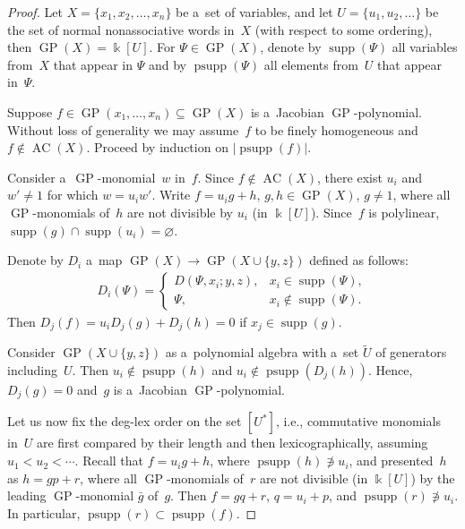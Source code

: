 \documentclass[pdftex]{sigma}
\DeclareMathOperator{\psupp}{psupp}
\DeclareMathOperator{\supp}{supp}
\begin{document}
\begin{proof}
Let $X=\{x_1,x_2,\dots, x_n \}$ be a~set of variables, and let $U=\{u_1,u_2,\dots \}$ be the set of normal
nonassociative words in~$X$ (with respect to some ordering), then $\operatorname{GP}(X) = \Bbbk[U]$.
For $\Psi \in \operatorname{GP}(X)$, denote by $\supp(\Psi)$ all variables from~$X$ that appear in $\Psi $ and by
$\psupp(\Psi)$ all elements from~$U$ that appear in~$\Psi $.

Suppose $f\in \operatorname{GP}(x_1,\dots, x_n)\subseteq \operatorname{GP}(X)$ is a~Jacobian $\operatorname{GP}$-polynomial.
Without loss of generality we may assume~$f$ to be f\/inely homogeneous and $f\notin \operatorname{AC}(X)$.
Proceed by induction on $|\psupp(f)|$.

Consider a~$\operatorname{GP}$-monomial~$w$ in~$f$.
Since $f\not\in \operatorname{AC}(X)$, there exist $u_i$ and $w'\neq 1$ for which $w = u_iw'$.
Write $f = u_ig + h$, $g,h\in \operatorname{GP}(X)$, $g\ne 1$, where all $\operatorname{GP}$-monomials of~$h$ are not divisible by $u_i$ (in $\Bbbk[U]$).
Since~$f$ is polylinear, $\supp(g) \cap \supp(u_i) = \varnothing$.

Denote by $D_i$ a~map $ \operatorname{GP}(X) \to \operatorname{GP}(X\cup \{y,z\})$ def\/ined as follows:
\begin{gather*}
D_i(\Psi) =
\begin{cases}
D(\Psi, x_i; y,z), & x_i\in \supp (\Psi),
\\
\Psi, & x_i\notin \supp (\Psi).
\end{cases}
\end{gather*}
Then $D_j(f) = u_iD_j(g) + D_j(h) = 0$ if $x_j \in \supp(g)$.

Consider $\operatorname{GP}(X\cup \{y,z\})$ as a~polynomial algebra with a~set $\widetilde U$ of generators including~$U$.
Then $u_i\notin \psupp(h)$ and $u_i\notin \psupp(D_j(h))$.
Hence, $D_j(g) = 0$ and~$g$ is a~Jacobian $\operatorname{GP}$-polynomial.

Let us now f\/ix the deg-lex order on the set $[U^*]$, i.e., commutative monomials in~$U$ are f\/irst compared by their
length and then lexicographically, assuming $u_1<u_2<\cdots $.
Recall that $f=u_ig+h$, where $\psupp(h)\not\ni u_i$, and presented~$h$ as $h=gp +r$, where all $\operatorname{GP}$-monomials
of~$r$ are not divisible (in $\Bbbk[U]$) by the leading $\operatorname{GP}$-monomial $\bar g$ of~$g$.
Then $f = gq + r$, $q = u_i + p$, and $\psupp(r)\not\ni u_i$.
In particular, $\psupp(r)\subset \psupp (f)$.


\end{proof}
\end{document}
